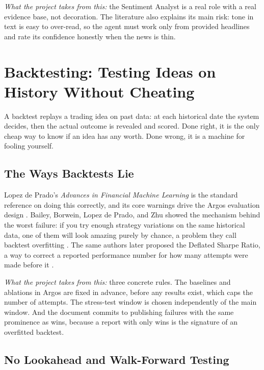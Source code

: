 \documentclass[conference]{IEEEtran}
\newcommand{\sys}{Argos}
\begin{document}
\emph{What the project takes from this:} the Sentiment Analyst is a real role with a real evidence base, not decoration. The literature also explains its main risk: tone in text is easy to over-read, so the agent must work only from provided headlines and rate its confidence honestly when the news is thin.

\section{Backtesting: Testing Ideas on History Without Cheating}
\label{sec:backtest}

A backtest replays a trading idea on past data: at each historical date the system decides, then the actual outcome is revealed and scored. Done right, it is the only cheap way to know if an idea has any worth. Done wrong, it is a machine for fooling yourself.

\subsection{The Ways Backtests Lie}

Lopez de Prado's \emph{Advances in Financial Machine Learning} is the standard reference on doing this correctly, and its core warnings drive the \sys{} evaluation design \cite{lopezdeprado2018advances}. Bailey, Borwein, Lopez de Prado, and Zhu showed the mechanism behind the worst failure: if you try enough strategy variations on the same historical data, one of them will look amazing purely by chance, a problem they call backtest overfitting \cite{bailey2014backtest}. The same authors later proposed the Deflated Sharpe Ratio, a way to correct a reported performance number for how many attempts were made before it \cite{bailey2014deflated}.

\emph{What the project takes from this:} three concrete rules. The baselines and ablations in \sys{} are fixed in advance, before any results exist, which caps the number of attempts. The stress-test window is chosen independently of the main window. And the document commits to publishing failures with the same prominence as wins, because a report with only wins is the signature of an overfitted backtest.

\subsection{No Lookahead and Walk-Forward Testing}
\end{document}
